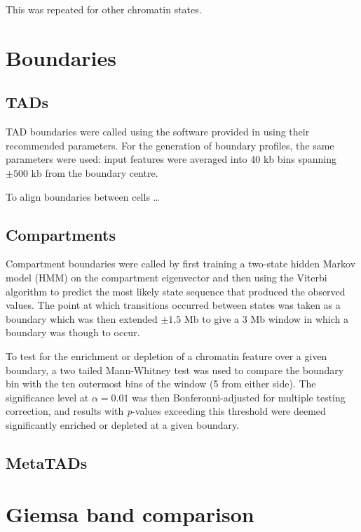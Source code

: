 \documentclass[a4paper,10pt,oneside]{book}
\begin{document}
This was repeated for other chromatin states.

\section{Boundaries}\label{boundaries}

\subsection{TADs}\label{tads}

TAD boundaries were called using the software provided in
\citet{Dixon2012} using their recommended parameters. For the generation
of boundary profiles, the same parameters were used: input features were
averaged into 40 kb bins spanning $\pm500$ kb from the boundary centre.

To align boundaries between cells \ldots

\subsection{Compartments}\label{sec:compartments}

Compartment boundaries were called by first training a two-state hidden
Markov model (HMM) on the compartment eigenvector and then using the
Viterbi algorithm to predict the most likely state sequence that
produced the observed values. The point at which transitions occurred
between states was taken as a boundary which was then extended $\pm 1.5$
Mb to give a 3 Mb window in which a boundary was though to occur.

To test for the enrichment or depletion of a chromatin feature over a
given boundary, a two tailed Mann-Whitney test was used to compare the
boundary bin with the ten outermost bins of the window (5 from either
side). The significance level at $\alpha = 0.01$ was then
Bonferonni-adjusted for multiple testing correction, and results with
\emph{p}-values exceeding this threshold were deemed significantly
enriched or depleted at a given boundary.

\subsection{MetaTADs}\label{sec:m-metatad}

\section{Giemsa band comparison}\label{giemsa-band-comparison}
\end{document}
